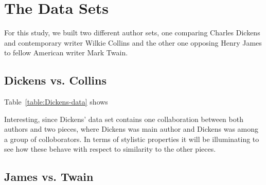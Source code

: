 \documentclass[a4paper,10pt,twoside,fleqn]{article}
\begin{document}
\section{The Data Sets} \label{sec:data}
For this study, we built two different author sets, one comparing Charles Dickens
and contemporary writer Wilkie Collins and the other one opposing Henry James 
to fellow American writer Mark Twain. 

\subsection{Dickens vs. Collins}
Table~\ref{table:Dickens-data} shows 

Interesting, since Dickens' data set contains one collaboration between both authors and 
two pieces, where Dickens was main author and Dickens was among a group of colloborators. 
In terms of stylistic properties it will be illuminating to see how these behave 
with respect to similarity to the other pieces. 



\subsection{James vs. Twain}
\end{document}
